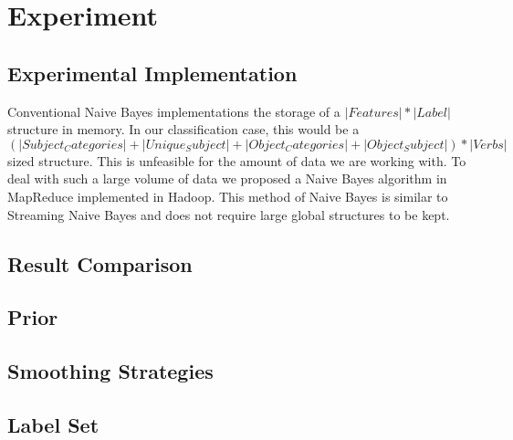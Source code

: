 \section{Experiment}

\subsection{Experimental Implementation}

Conventional Naive Bayes implementations the storage of a $|Features| * |Label|$ structure in memory. In our classification case, this would be a $(|Subject_Categories|+|Unique_Subject|+|Object_Categories|+|Object_Subject|) * |Verbs|$ sized structure. This is unfeasible for the amount of data we are working with. To deal with such a large volume of data we proposed a Naive Bayes algorithm in MapReduce implemented in Hadoop. This method of Naive Bayes is similar to Streaming Naive Bayes and does not require large global structures to be kept.

\subsection{Result Comparison}

\subsection{Prior}

\subsection{Smoothing Strategies}

\subsection{Label Set}


